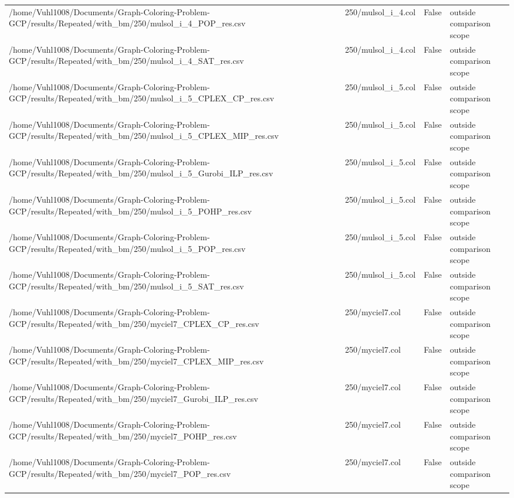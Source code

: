 \begin{table}[htbp]
\begin{tabular}{llll}
/home/Vuhl1008/Documents/Graph-Coloring-Problem-GCP/results/Repeated/with\_bm/250/mulsol\_i\_4\_POP\_res.csv & 250/mulsol\_i\_4.col & False & outside comparison scope \\
/home/Vuhl1008/Documents/Graph-Coloring-Problem-GCP/results/Repeated/with\_bm/250/mulsol\_i\_4\_SAT\_res.csv & 250/mulsol\_i\_4.col & False & outside comparison scope \\
/home/Vuhl1008/Documents/Graph-Coloring-Problem-GCP/results/Repeated/with\_bm/250/mulsol\_i\_5\_CPLEX\_CP\_res.csv & 250/mulsol\_i\_5.col & False & outside comparison scope \\
/home/Vuhl1008/Documents/Graph-Coloring-Problem-GCP/results/Repeated/with\_bm/250/mulsol\_i\_5\_CPLEX\_MIP\_res.csv & 250/mulsol\_i\_5.col & False & outside comparison scope \\
/home/Vuhl1008/Documents/Graph-Coloring-Problem-GCP/results/Repeated/with\_bm/250/mulsol\_i\_5\_Gurobi\_ILP\_res.csv & 250/mulsol\_i\_5.col & False & outside comparison scope \\
/home/Vuhl1008/Documents/Graph-Coloring-Problem-GCP/results/Repeated/with\_bm/250/mulsol\_i\_5\_POHP\_res.csv & 250/mulsol\_i\_5.col & False & outside comparison scope \\
/home/Vuhl1008/Documents/Graph-Coloring-Problem-GCP/results/Repeated/with\_bm/250/mulsol\_i\_5\_POP\_res.csv & 250/mulsol\_i\_5.col & False & outside comparison scope \\
/home/Vuhl1008/Documents/Graph-Coloring-Problem-GCP/results/Repeated/with\_bm/250/mulsol\_i\_5\_SAT\_res.csv & 250/mulsol\_i\_5.col & False & outside comparison scope \\
/home/Vuhl1008/Documents/Graph-Coloring-Problem-GCP/results/Repeated/with\_bm/250/myciel7\_CPLEX\_CP\_res.csv & 250/myciel7.col & False & outside comparison scope \\
/home/Vuhl1008/Documents/Graph-Coloring-Problem-GCP/results/Repeated/with\_bm/250/myciel7\_CPLEX\_MIP\_res.csv & 250/myciel7.col & False & outside comparison scope \\
/home/Vuhl1008/Documents/Graph-Coloring-Problem-GCP/results/Repeated/with\_bm/250/myciel7\_Gurobi\_ILP\_res.csv & 250/myciel7.col & False & outside comparison scope \\
/home/Vuhl1008/Documents/Graph-Coloring-Problem-GCP/results/Repeated/with\_bm/250/myciel7\_POHP\_res.csv & 250/myciel7.col & False & outside comparison scope \\
/home/Vuhl1008/Documents/Graph-Coloring-Problem-GCP/results/Repeated/with\_bm/250/myciel7\_POP\_res.csv & 250/myciel7.col & False & outside comparison scope \\

\end{tabular}
\end{table}
